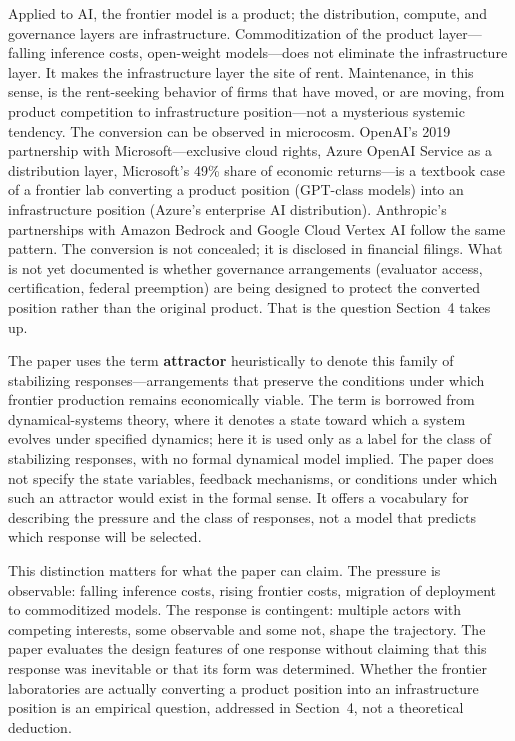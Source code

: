 Applied to AI, the frontier model is a product; the distribution, compute, and governance layers are infrastructure. Commoditization of the product layer---falling inference costs, open-weight models---does not eliminate the infrastructure layer. It makes the infrastructure layer the site of rent. Maintenance, in this sense, is the rent-seeking behavior of firms that have moved, or are moving, from product competition to infrastructure position---not a mysterious systemic tendency. The conversion can be observed in microcosm. OpenAI's 2019 partnership with Microsoft---exclusive cloud rights, Azure OpenAI Service as a distribution layer, Microsoft's 49\% share of economic returns---is a textbook case of a frontier lab converting a product position (GPT-class models) into an infrastructure position (Azure's enterprise AI distribution). Anthropic's partnerships with Amazon Bedrock and Google Cloud Vertex AI follow the same pattern. The conversion is not concealed; it is disclosed in financial filings. What is not yet documented is whether governance arrangements (evaluator access, certification, federal preemption) are being designed to protect the converted position rather than the original product. That is the question Section~4 takes up.

The paper uses the term \textbf{attractor} heuristically to denote this family of stabilizing responses---arrangements that preserve the conditions under which frontier production remains economically viable. The term is borrowed from dynamical-systems theory, where it denotes a state toward which a system evolves under specified dynamics; here it is used only as a label for the class of stabilizing responses, with no formal dynamical model implied. The paper does not specify the state variables, feedback mechanisms, or conditions under which such an attractor would exist in the formal sense. It offers a vocabulary for describing the pressure and the class of responses, not a model that predicts which response will be selected.

This distinction matters for what the paper can claim. The pressure is observable: falling inference costs, rising frontier costs, migration of deployment to commoditized models. The response is contingent: multiple actors with competing interests, some observable and some not, shape the trajectory. The paper evaluates the design features of one response without claiming that this response was inevitable or that its form was determined. Whether the frontier laboratories are actually converting a product position into an infrastructure position is an empirical question, addressed in Section~4, not a theoretical deduction.
